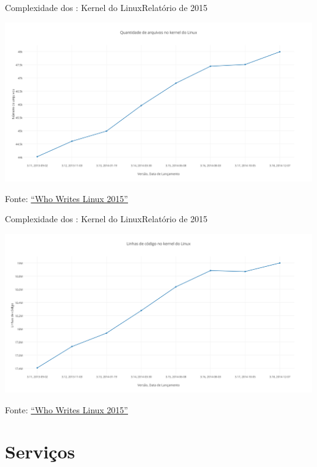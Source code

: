 \def\source{{\scriptsize Fonte: \href{http://www.linuxfoundation.org/publications/linux-foundation/who-writes-linux-2015}{``Who Writes Linux 2015''}}}

\begin{frame}{Complexidade dos \so{}: Kernel do Linux}{Relatório de 2015}

  \includegraphics[scale=.35]{img/linux-files-2015.png}

  \source
\end{frame}

\begin{frame}{Complexidade dos \so{}: Kernel do Linux}{Relatório de 2015}
  
  \includegraphics[scale=.35]{img/linux-code-2015.png}

  \source
\end{frame}

\def\sectiontitle{Serviços}
\section{\sectiontitle}

